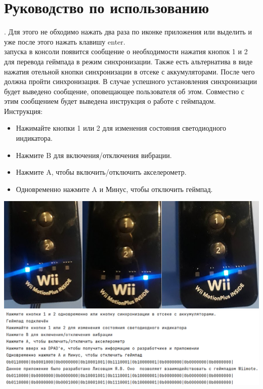 \section{Руководство по использованию}
.
Для этого не обходимо нажать два раза по иконке приложения или выделить и уже после этого нажать клавишу enter.\\
 запуска в консоли появится сообщение о необходимости нажатия кнопок 1 и 2 для перевода геймпада в режим синхронизации.
Также есть альтернатива в виде нажатия отельной кнопки синхронизации в отсеке с аккумуляторами.
После чего должна пройти синхронизация.
В случае успешного установления синхронизации будет выведено сообщение, оповещающее пользователя об этом.
\quad Совместно с этим сообщением будет выведена инструкция о работе с геймпадом.\\
\quad Инструкция:\\
\begin{itemize}
    \item Нажимайте кнопки 1 или 2 для изменения состояния светодиодного индикатора.
    \item Нажмите B для включения/отключения вибрации.
    \item Нажмите A, чтобы включить/отключить акселерометр.
    \item {Одновременно нажмите A и Минус, чтобы отключить геймпад.}
\end{itemize}
\includegraphics[width=\textwidth]{content/LedsChange}
\includegraphics[width=\textwidth]{content/ProgramOutput}
